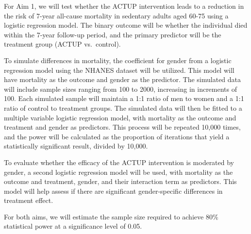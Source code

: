 \documentclass[
  12pt,
]{article}
\begin{document}
For Aim 1, we will test whether the ACTUP intervention leads to a
reduction in the risk of 7-year all-cause mortality in sedentary adults
aged 60-75 using a logistic regression model. The binary outcome will be
whether the individual died within the 7-year follow-up period, and the
primary predictor will be the treatment group (ACTUP vs.~control).

To simulate differences in mortality, the coefficient for gender from a
logistic regression model using the NHANES dataset will be utilized.
This model will have mortality as the outcome and gender as the
predictor. The simulated data will include sample sizes ranging from 100
to 2000, increasing in increments of 100. Each simulated sample will
maintain a 1:1 ratio of men to women and a 1:1 ratio of control to
treatment groups. The simulated data will then be fitted to a multiple
variable logistic regression model, with mortality as the outcome and
treatment and gender as predictors. This process will be repeated 10,000
times, and the power will be calculated as the proportion of iterations
that yield a statistically significant result, divided by 10,000.

To evaluate whether the efficacy of the ACTUP intervention is moderated
by gender, a second logistic regression model will be used, with
mortality as the outcome and treatment, gender, and their interaction
term as predictors. This model will help assess if there are significant
gender-specific differences in treatment effect.

For both aims, we will estimate the sample size required to achieve 80\%
statistical power at a significance level of 0.05.
\end{document}
